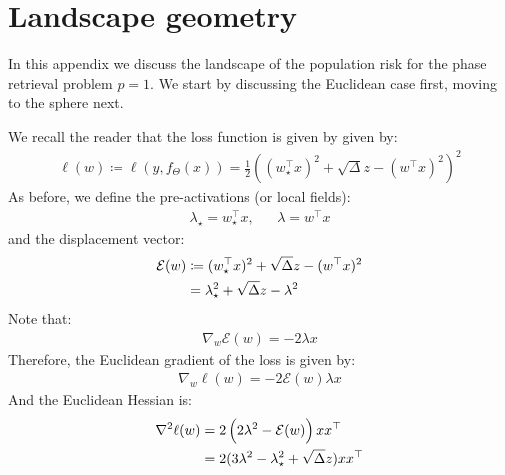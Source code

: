 \section{Landscape geometry}

\label{2305:app:landscape}
In this appendix we discuss the landscape of the population risk for the phase retrieval problem $p=1$. We start by discussing the Euclidean case first, moving to the sphere next. 

We recall the reader that the loss function is given by given by:
\begin{align}
\label{2305:eq:app:poprisk}
\ell(w) \coloneqq \ell(y,f_{\Theta}(x)) =  \frac{1}{2}\left((w_{\star}^{\top}x)^2+\sqrt{\Delta}z-(w^{\top}x)^2\right)^2
\end{align}
As before, we define the pre-activations (or local fields):
\begin{align}
    \lambda_{\star} = w_{\star}^{\top}x, && \lambda = w^{\top}x
\end{align}
and the displacement vector:
\begin{align}
    \mathcal{E}(w) &\coloneqq (w_{\star}^{\top}x)^2+\sqrt{\Delta}z-(w^{\top}x)^2 \notag\\
    &=  \lambda_{\star}^2 + \sqrt{\Delta}z-\lambda^2
\end{align}
Note that:
\begin{align}
    \nabla_{w}\mathcal{E}(w) = -2\lambda x
\end{align}
Therefore, the Euclidean gradient of the loss is given by:
\begin{align}
    \nabla_w \ell(w) =-2 \mathcal{E}(w)\lambda x
\end{align}
And the Euclidean Hessian is:
\begin{align}
    \nabla^2 \ell(w) &= 2\left(2\lambda^2-\mathcal{E}(w)\right) xx^{\top} \notag\\
    &=2(3\lambda^2-\lambda_{\star}^2+\sqrt{\Delta}z)xx^{\top}
\end{align}
